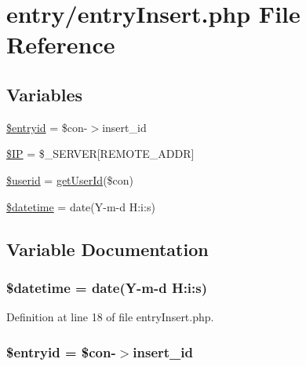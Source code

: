 \hypertarget{entry_insert_8php}{}\section{entry/entry\+Insert.php File Reference}
\label{entry_insert_8php}
\subsection*{Variables}
\begin{DoxyCompactItemize}
\item 
\hyperlink{entry_insert_8php_a042b0cd424140ddc02e4b8c0cc475511}{\$entryid} = \$con-\/$>$insert\+\_\+id
\item 
\hyperlink{entry_insert_8php_a04624d7a6de9eb3d2621472352bb6dcb}{\$\+IP} = \$\+\_\+\+S\+E\+R\+V\+ER\mbox{[}\textquotesingle{}R\+E\+M\+O\+T\+E\+\_\+\+A\+D\+DR\textquotesingle{}\mbox{]}
\item 
\hyperlink{entry_insert_8php_ae3f4f74a2aff9863a4767269a47aea11}{\$userid} = \hyperlink{entry_library_8php_a4755dafd9341dedfdc581773a8c11bc2}{get\+User\+Id}(\$con)
\item 
\hyperlink{entry_insert_8php_a2a773514f824eaf95f9eef85810710e3}{\$datetime} = date(\textquotesingle{}Y-\/m-\/d H\+:i\+:s\textquotesingle{})
\end{DoxyCompactItemize}


\subsection{Variable Documentation}
\subsubsection[{\texorpdfstring{\$datetime}{$datetime}}]{\setlength{\rightskip}{0pt plus 5cm}\$datetime = date(\textquotesingle{}Y-\/m-\/d H\+:i\+:s\textquotesingle{})}\hypertarget{entry_insert_8php_a2a773514f824eaf95f9eef85810710e3}{}\label{entry_insert_8php_a2a773514f824eaf95f9eef85810710e3}


Definition at line 18 of file entry\+Insert.\+php.

\subsubsection[{\texorpdfstring{\$entryid}{$entryid}}]{\setlength{\rightskip}{0pt plus 5cm}\$entryid = \$con-\/$>$insert\+\_\+id}\hypertarget{entry_insert_8php_a042b0cd424140ddc02e4b8c0cc475511}{}\label{entry_insert_8php_a042b0cd424140ddc02e4b8c0cc475511}


